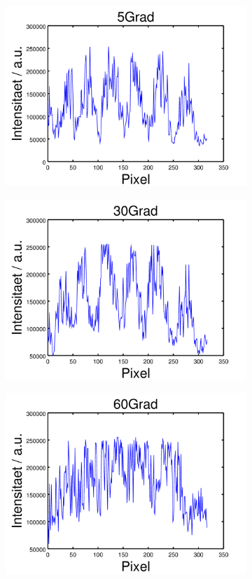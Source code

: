 \documentclass[numbers=noenddot,a4paper,notitlepage,twoside,BCOR15mm]{scrartcl}
\begin{document}
\begin{figure}
	\centering
	\begin{subfigure}{.49\textwidth}
		\centering
		\includegraphics[width=0.75\linewidth]{pics/5grad.png}
	\end{subfigure}
	\begin{subfigure}{.49\textwidth}
		\centering
		\includegraphics[width=0.75\linewidth]{pics/30grad.png}
	\end{subfigure}
	\begin{subfigure}{.49\textwidth}
		\centering
		\includegraphics[width=0.75\linewidth]{pics/60grad.png}

\end{subfigure}
\end{figure}
\end{document}
